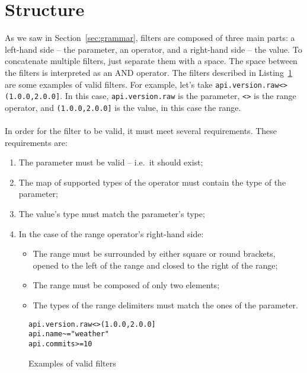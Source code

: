 \section{Structure}\label{sec:structure}
As we saw in Section~\ref{sec:grammar}, filters are composed of three main parts: a left-hand side -- the parameter, an operator, and a right-hand side -- the value.
To concatenate multiple filters, just separate them with a space.
The space between the filters is interpreted as an AND operator.
The filters described in Listing~\ref{fig:example-filters} are some examples of valid filters.
For example, let's take \verb|api.version.raw<>(1.0.0,2.0.0]|.
In this case, \verb|api.version.raw| is the parameter, \verb|<>| is the range operator, and \verb|(1.0.0,2.0.0]| is the value, in this case the range. \\ \\
In order for the filter to be valid, it must meet several requirements.
These requirements are:

\begin{enumerate}
    \item The parameter must be valid -- i.e.\ it should exist;
    \item The map of supported types of the operator must contain the type of the parameter;
    \item The value's type must match the parameter's type;
    \item In the case of the range operator's right-hand side:
    \begin{itemize}
        \item The range must be surrounded by either square or round brackets, opened to the left of the range and closed to the right of the range;
        \item The range must be composed of only two elements;
        \item The types of the range delimiters must match the ones of the parameter.
    \end{itemize}
\end{enumerate}

\begin{figure}[!h]
    \begin{center}
        \verb|api.version.raw<>(1.0.0,2.0.0]| \\
        \verb|api.name~="weather"| \\
        \verb|api.commits>=10|
    \end{center}

    \caption{Examples of valid filters}
    \label{fig:example-filters}
\end{figure}
